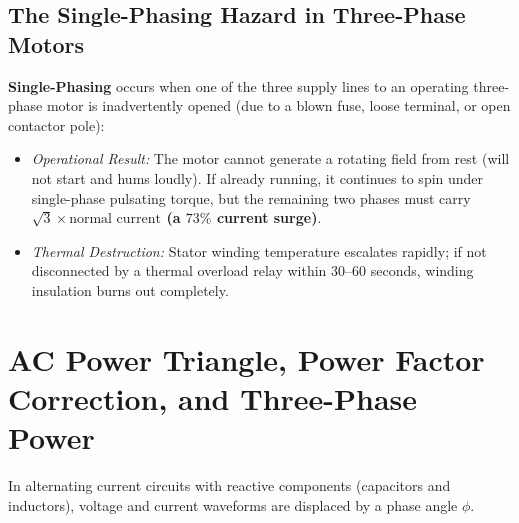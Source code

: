 \subsection{The Single-Phasing Hazard in Three-Phase Motors}
\textbf{Single-Phasing} occurs when one of the three supply lines to an operating three-phase motor is inadvertently opened (due to a blown fuse, loose terminal, or open contactor pole):
\begin{itemize}
    \item \textit{Operational Result:} The motor cannot generate a rotating field from rest (will not start and hums loudly). If already running, it continues to spin under single-phase pulsating torque, but the remaining two phases must carry \textbf{$\sqrt{3} \times \text{normal current}$ (a $73\%$ current surge)}.
    \item \textit{Thermal Destruction:} Stator winding temperature escalates rapidly; if not disconnected by a thermal overload relay within $30$--$60$ seconds, winding insulation burns out completely.
\end{itemize}


\section{AC Power Triangle, Power Factor Correction, and Three-Phase Power}
\label{sec:power_factor}

In alternating current circuits with reactive components (capacitors and inductors), voltage and current waveforms are displaced by a phase angle $\phi$.

